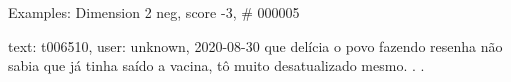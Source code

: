 \begin{frame}{Examples: Dimension 2 neg, score -3, \# 000005}
\footnotesize
\begin{alertblock}{text: t006510, user: unknown, 2020-08-30}
que delícia o povo fazendo resenha  
\textbf{}  não sabia que 
já tinha saído a vacina, tô muito desatualizado mesmo. . . 
\end{alertblock}
\end{frame}
